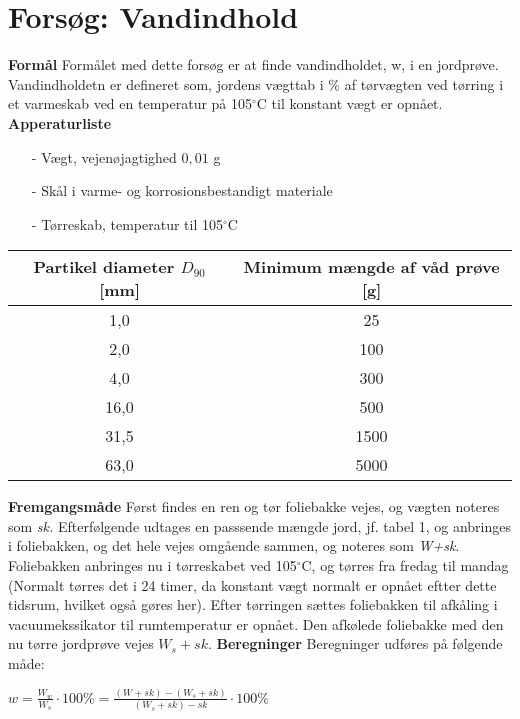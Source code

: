 \chapter{Forsøg: Vandindhold}

\textbf{Formål}
\newline
Formålet med dette forsøg er at finde vandindholdet, w, i en jordprøve. Vandindholdetn er defineret som, jordens vægttab i \% af tørvægten ved tørring i et varmeskab ved en temperatur på 105$^{\circ}$C til konstant vægt er opnået.
\newline
\newline
\textbf{Apperaturliste}
\begin{itemize}
\item[-] Vægt, vejenøjagtighed $0,\!01$ g
\item[-] Skål i varme- og korrosionsbestandigt materiale
\item[-] Tørreskab, temperatur til 105$^{\circ}$C
\end{itemize}

\begin{center}
	\begin{tabular}{ |c|c| } 
		\hline
		Partikel diameter $D_{90}$ [mm] & Minimum mængde af våd prøve [g] \\	\hline
		1,0 & 25 \\		\hline
		2,0 & 100 \\	\hline 
		4,0 & 300 \\ 	\hline
		16,0 & 500 \\	\hline
		31,5 & 1500 \\	\hline
		63,0 & 5000 \\	\hline	
	\end{tabular}
\end{center}

\textbf{Fremgangsmåde}
\newline
Først findes en ren og tør foliebakke vejes, og vægten noteres som \textit{sk.} Efterfølgende udtages en passsende mængde jord, jf. tabel 1, og anbringes i foliebakken, og det hele vejes omgående sammen, og noteres som \textit{W+sk}.
\newline
Foliebakken anbringes nu i tørreskabet ved 105$^{\circ}$C, og tørres fra fredag til mandag (Normalt tørres det i 24 timer, da konstant vægt normalt er opnået eftter dette tidsrum, hvilket også gøres her). Efter tørringen sættes foliebakken til afkåling i vacuumekssikator til rumtemperatur er opnået. Den afkølede foliebakke med den nu tørre jordprøve vejes \textit{$W_{s}+sk$}.
\newline
\newline
\textbf{Beregninger}
\newline
Beregninger udføres på følgende måde:
\begin{center}
	$w=\frac{W_w}{W_s}\cdot100\%=\frac{(W + sk) - (W_s + sk)}{(W_s + sk) - sk}\cdot100\%$
\end{center}

